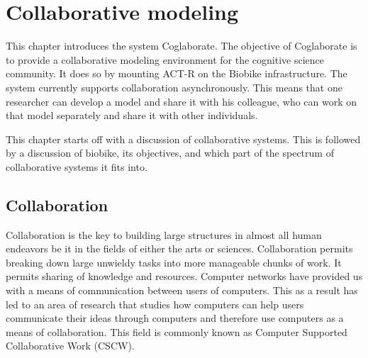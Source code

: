 
\chapter{Collaborative modeling}
\label{chap-four}


This chapter introduces the system Coglaborate.
%
The objective of Coglaborate is to provide a collaborative modeling
environment for the cognitive science community. It does so by
mounting ACT-R on the Biobike infrastructure. The system currently
supports collaboration asynchronously. This means that one researcher
can develop a model and share it with his colleague, who can work on
that model separately and share it with other individuals.


This chapter starts off with a discussion of collaborative
systems. This is followed by a discussion of biobike, its objectives,
and which part of the spectrum of collaborative systems it fits
into.

\section{Collaboration}
Collaboration is the key to building large structures in almost all
human endeavors be it in the fields of either the arts or
sciences. Collaboration permits breaking down large unwieldy tasks
into more manageable chunks of work. It permits sharing of knowledge
and resources. Computer networks have provided us with a means of
communication between users of computers. This as a result has led to
an area of research that studies how computers can help users
communicate their ideas through computers and therefore use computers
as a means of collaboration.  This field is commonly known as Computer
Supported Collaborative Work (CSCW).

